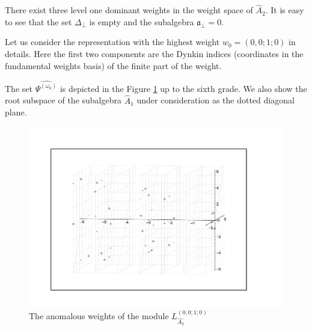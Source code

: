 \documentclass[a4paper,12pt]{article}
\theoremstyle{definition} \newtheorem{Def}{Definition}
\begin{document}
There exist three level one dominant weights in the weight space of $\hat{A}_2$.
It is easy to see that the set $\Delta_{\bot}$ is empty and the subalgebra $\mathfrak{a}_{\bot}=0$.

Let us consider the representation with the highest weight $w_0=(0,0;1;0)$ in details. Here the first two components are the Dynkin indices (coordinates in the fundamental weights basis) of the finite part of the weight.

The set $\widehat{\Psi^{(\omega_0)}}$  is depicted in the Figure \ref{fig:affine_A2_anom_point} up to the sixth grade. We also show the root subspace of the subalgebra $\hat{A}_1$ under consideration as the dotted diagonal plane.

\begin{figure}[h!tb]
  \centering
  \includegraphics[width=180mm]{AffineA2_A1_anom.pdf}
  \caption{The anomalous weights of the module $L^{(0,0;1;0)}_{\hat{A_2}}$}
  \label{fig:affine_A2_anom_point}
\end{figure}
\end{document}
